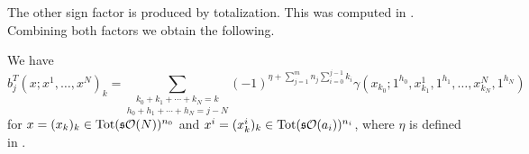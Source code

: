 \documentclass[join.tex]{subfiles}
\begin{document}
The other sign factor is produced by totalization. This was computed in . Combining both factors we obtain the following.

\begin{lem}
We have 
\begin{equation}\label{bracetot}
b_j^T(x;x^1,\dots, x^N)_k=\underset{h_0+h_1+\cdots+h_N=j-N}{\sum_{k_0+k_1+\cdots+k_N=k}}(-1)^{\eta+\sum_{j=1}^m n_j\sum_{i=0}^{j-1}k_i}\gamma(x_{k_0};1^{h_0},x^1_{k_1},1^{h_1},\dots, x^N_{k_N},1^{h_N})
\end{equation}
for $x=(x_k)_k\in\mathrm{Tot}(\mathfrak{s}{\mathcal O}(N))^{n_0}$ and $x^i=(x^i_k)_k\in\mathrm{Tot}(\mathfrak{s}{\mathcal O}(a_i))^{n_i}$, where $\eta$ is defined in . 
\end{lem}
%
%
\end{document}
